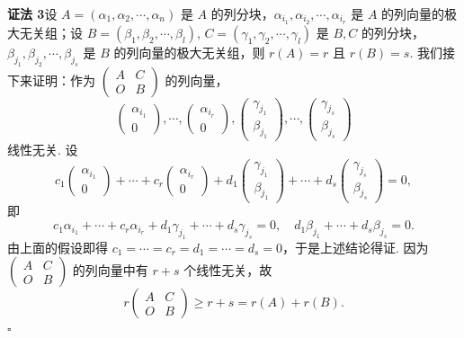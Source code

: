 \documentclass[UTF8, 12pt, fontset=fandol, oneside]{ctexart}
\begin{document}
\noindent\textbf{证法 3}\quad 设 $A=(\alpha_1,\alpha_2,\cdots,\alpha_n)$ 是 $A$ 的列分块，$\alpha_{i_1},\alpha_{i_2},\cdots,\alpha_{i_r}$ 是 $A$ 的列向量的极大无关组；设 $B=(\beta_1,\beta_2,\cdots,\beta_l)$, $C=(\gamma_1,\gamma_2,\cdots,\gamma_l)$ 是 $B,C$ 的列分块，$\beta_{j_1},\beta_{j_2},\cdots,\beta_{j_s}$ 是 $B$ 的列向量的极大无关组，则 $r(A)=r$ 且 $r(B)=s$. 我们接下来证明：作为 $\begin{pmatrix}A&C\\O&B\end{pmatrix}$ 的列向量，
\[
\begin{pmatrix}\alpha_{i_1}\\0\end{pmatrix},\cdots,\begin{pmatrix}\alpha_{i_r}\\0\end{pmatrix},
\begin{pmatrix}\gamma_{j_1}\\\beta_{j_1}\end{pmatrix},\cdots,
\begin{pmatrix}\gamma_{j_s}\\\beta_{j_s}\end{pmatrix}
\]
线性无关. 设
\[
c_1\begin{pmatrix}\alpha_{i_1}\\0\end{pmatrix}+\cdots+c_r\begin{pmatrix}\alpha_{i_r}\\0\end{pmatrix}
+d_1\begin{pmatrix}\gamma_{j_1}\\\beta_{j_1}\end{pmatrix}+\cdots+d_s\begin{pmatrix}\gamma_{j_s}\\\beta_{j_s}\end{pmatrix}=0,
\]
即
\[
c_1\alpha_{i_1}+\cdots+c_r\alpha_{i_r}+d_1\gamma_{j_1}+\cdots+d_s\gamma_{j_s}=0,\quad
d_1\beta_{j_1}+\cdots+d_s\beta_{j_s}=0.
\]
由上面的假设即得 $c_1=\cdots=c_r=d_1=\cdots=d_s=0$，于是上述结论得证. 因为 $\begin{pmatrix}A&C\\O&B\end{pmatrix}$ 的列向量中有 $r+s$ 个线性无关，故
\[
r\begin{pmatrix}A&C\\O&B\end{pmatrix}\ge r+s=r(A)+r(B).
\]
$\square$
\end{document}
